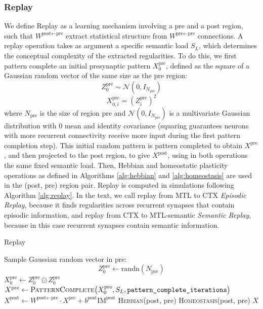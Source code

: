 \documentclass{article}
\begin{document}
\subsubsection*{Replay}
We define \textrm{Replay} as a learning mechanism involving a pre and a post region, such that $W^{\textrm{post}\leftarrow\textrm{pre}}$ extract statistical structure from $W^{\textrm{pre}\leftarrow\textrm{pre}}$ connections. A replay operation takes as argument a specific semantic load $S_L$, which determines the conceptual complexity of the extracted regularities. To do this, we first pattern complete an initial presynaptic pattern $X^\textrm{pre}_0$, defined as the square of a Gaussian random vector of the same size as the pre region:
\begin{equation}
    Z_0^\textrm{pre} \sim \mathcal{N}(0, I_{N_\textrm{pre}})
\end{equation}
\begin{equation}
    X^\textrm{pre}_{0, i} = (Z^\textrm{pre}_i)^2
\end{equation}
where $N_\textrm{pre}$ is the size of region pre and $\mathcal{N}(0, I_{N_\textrm{pre}})$ is a multivariate Gaussian distribution with 0 mean and identity covariance (squaring guarantees neurons with more recurrent connectivity receive more input during the first pattern completion step). This initial random pattern is pattern completed to obtain $X^\textrm{pre}$, and then projected to the post region, to give $X^\textrm{post}$, using in both operations the same fixed semantic load. Then, Hebbian and homeostatic plasticity operations as defined in Algorithms \ref{alg:hebbian} and \ref{alg:homeostasis} are used in the (post, pre) region pair. Replay is computed in simulations following Algorithm \ref{alg:replay}. In the text, we call replay from MTL to CTX \textit{Episodic Replay}, because it finds regularities across recurrent synapses that contain episodic information, and replay from CTX to MTL-semantic \textit{Semantic Replay}, because in this case recurrent synapses contain semantic information.
\begin{algorithm}[h!]
\caption{Replay}\label{alg:replay}
\begin{algorithmic}[1]
    \State Sample Gaussian random vector in pre:
        \[
            Z_0^\textrm{pre} \gets \text{randn}(N_\textrm{pre})
        \]
    \State $X_0^\textrm{pre} \gets Z_0^\textrm{pre} \odot Z_0^\textrm{pre}$
    \State $X^\textrm{pre} \gets \textsc{PatternComplete}\bigl(X^\textrm{pre}_0, S_L, \texttt{pattern\_complete\_iterations}\bigr)$
    \State $X^\textrm{post} \gets W^{\textrm{post}\leftarrow\textrm{pre}}\cdot X^\textrm{pre} + b^\textrm{post}\textrm{IM}^\textrm{post}$
    \State \textsc{Hebbian}(post, pre)
    \State \textsc{Homeostasis}(post, pre)
    \State \Return $X$
\EndFunction
\end{algorithmic}
\end{algorithm}
\end{document}
